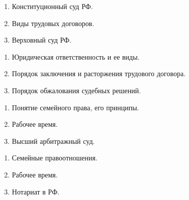 \newpage


\shapkFull
\setcounter{zad}{0}

\begin{enumerate}
	\item Конституционный суд РФ.

	\item Виды трудовых договоров.

	\item Верховный суд РФ.

\end{enumerate}

\newpage


\shapkFull
\setcounter{zad}{0}

\begin{enumerate}
	\item Юридическая ответственность и ее виды.

	\item Порядок заключения и расторжения трудового договора.

	\item Порядок обжалования судебных решений.

\end{enumerate}

\newpage


\shapkFull
\setcounter{zad}{0}

\begin{enumerate}
	\item Понятие семейного права, его принципы.

	\item Рабочее время.

	\item Высший арбитражный суд.

\end{enumerate}

\newpage


\shapkFull
\setcounter{zad}{0}

\begin{enumerate}
	\item Семейные правоотношения.

	\item Рабочее время.

	\item Нотариат в РФ.

\end{enumerate}

